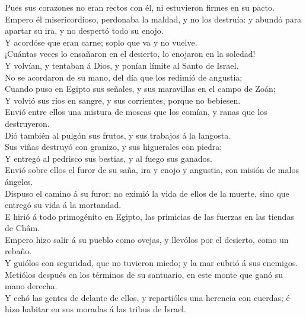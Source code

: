  Pues sus corazones no eran rectos con él, ni estuvieron
firmes en su pacto.\\
 Empero él misericordioso, perdonaba la maldad, y no los
destruía: y abundó para apartar su ira, y no despertó todo su enojo.\\
 Y acordóse que eran carne; soplo que va y no vuelve.\\
 ¡Cuántas veces lo ensañaron en el desierto, lo enojaron en
la soledad!\\
 Y volvían, y tentaban á Dios, y ponían límite al Santo de
Israel.\\
 No se acordaron de su mano, del día que los redimió de
angustia;\\
 Cuando puso en Egipto sus señales, y sus maravillas en el
campo de Zoán;\\
 Y volvió sus ríos en sangre, y sus corrientes, porque no
bebiesen.\\
 Envió entre ellos una mistura de moscas que los comían, y
ranas que los destruyeron.\\
 Dió también al pulgón sus frutos, y sus trabajos á la
langosta.\\
 Sus viñas destruyó con granizo, y sus higuerales con
piedra;\\
 Y entregó al pedrisco sus bestias, y al fuego sus
ganados.\\
 Envió sobre ellos el furor de su saña, ira y enojo y
angustia, con misión de malos ángeles.\\
 Dispuso el camino á su furor; no eximió la vida de ellos
de la muerte, sino que entregó su vida á la mortandad.\\
 E hirió á todo primogénito en Egipto, las primicias de las
fuerzas en las tiendas de Châm.\\
 Empero hizo salir á su pueblo como ovejas, y llevólos por
el desierto, como un rebaño.\\
 Y guiólos con seguridad, que no tuvieron miedo; y la mar
cubrió á sus enemigos.\\
 Metiólos después en los términos de su santuario, en este
monte que ganó su mano derecha.\\
 Y echó las gentes de delante de ellos, y repartióles una
herencia con cuerdas; é hizo habitar en sus moradas á las tribus de
Israel.\\
